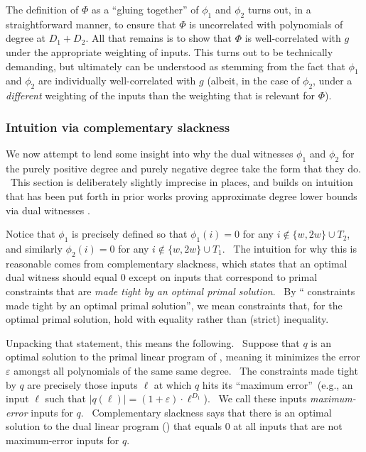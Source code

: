 \documentclass[10pt,a4paper]{article}
\newcommand{\<}{\langle}
\renewcommand{\>}{\rangle}
\begin{document}
The definition of $\Phi$
as a ``gluing together'' of $\phi_1$ and $\phi_2$
turns out, in a
straightforward manner, to ensure
that $\Phi$ is uncorrelated
with polynomials of degree at 
$D_1 + D_2$. 
All that remains is to
show that $\Phi$ is well-correlated
with $g$ under the appropriate
weighting of inputs. 
This turns out to be technically demanding, but ultimately
can be understood as stemming from the fact that 
$\phi_1$ and $\phi_2$ are individually
well-correlated with $g$ (albeit, in the case of $\phi_2$, under a
\emph{different} weighting of the inputs than the weighting that is relevant for $\Phi$). 

\subsubsection{Intuition via complementary slackness}

\label{s:nextsubsection}We now attempt to lend some insight into why the
dual witnesses $\phi_1 $ and $\phi_2 $ for the purely positive degree and purely
negative degree take the form that they do. \ This section is deliberately
slightly imprecise in places, and builds on intuition that has been put
forth in prior works proving approximate degree lower bounds via dual
witnesses \cite{bt13, Tha16, bkt}.

Notice that $\phi_1 $ is precisely defined so that $\phi_1 (i)=0$ for any $
i\not\in \{w,2w\}\cup T_{2}$, and similarly $\phi_2 (i)=0$ for any $i\not\in
\{w,2w\}\cup T_{1}$. \ The intuition for why this is reasonable comes from
complementary slackness, which states that an optimal dual witness should
equal $0$ except on inputs that correspond to primal constraints that are
\emph{made tight by an optimal primal solution}. \ By \textquotedblleft
constraints made tight by an optimal primal solution\textquotedblright , we
mean constraints that, for the optimal primal solution, hold with equality
rather than (strict) inequality.

Unpacking that statement, this means the following. \ Suppose that $q$ is an
optimal solution to the primal linear program of , meaning it
minimizes the error $\varepsilon $ amongst all polynomials of the same same
degree. \ The constraints made tight by $q$ are precisely those inputs $\ell
$ at which $q$ hits its \textquotedblleft maximum error\textquotedblright\
(e.g., an input $\ell$ such that $|q(\ell)|=(1+\varepsilon )\cdot \ell ^{D_{1}}$).
\ We call these inputs \emph{maximum-error} inputs for $q$. \ Complementary
slackness says that there is an optimal solution to the dual linear program ()
that equals $0$ at all inputs that are not maximum-error inputs for $q$.
\end{document}
